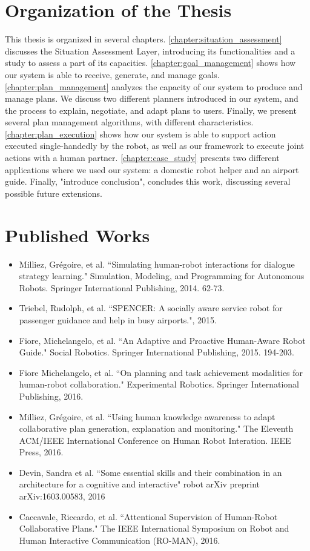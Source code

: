 \section{Organization of the Thesis}
This thesis is organized in several chapters. \ref{chapter:situation_assessment} discusses the Situation Assessment Layer, introducing its functionalities and a study to assess a part of its capacities. \ref{chapter:goal_management} shows how our system is able to receive, generate, and manage goals. \ref{chapter:plan_management} analyzes the capacity of our system to produce and manage plans. We discuss two different planners introduced in our system, and the process to explain, negotiate, and adapt plans to users. Finally, we present several plan management algorithms, with different characteristics. \ref{chapter:plan_execution} shows how our system is able to support action executed single-handedly by the robot, as well as our framework to execute joint actions with a human partner. \ref{chapter:case_study} presents two different applications where we used our system: a domestic robot helper and an airport guide. Finally, "introduce conclusion", concludes this work, discussing several possible future extensions. 

\section{Published Works}
\begin{itemize}
\item Milliez, Grégoire, et al. ``Simulating human-robot interactions for dialogue strategy learning." Simulation, Modeling, and Programming for Autonomous Robots. Springer International Publishing, 2014. 62-73.
\item Triebel, Rudolph, et al. ``SPENCER: A socially aware service robot for passenger guidance and help in busy airports.", 2015.
\item Fiore, Michelangelo, et al. ``An Adaptive and Proactive Human-Aware Robot Guide." Social Robotics. Springer International Publishing, 2015. 194-203.
\item Fiore Michelangelo, et al. ``On planning and task achievement modalities for human-robot collaboration." Experimental Robotics. Springer International Publishing, 2016.
\item Milliez, Grégoire, et al. ``Using human knowledge awareness to adapt collaborative plan generation, explanation and monitoring." The Eleventh ACM/IEEE International Conference on Human Robot Interation. IEEE Press, 2016.
\item Devin, Sandra et al. ``Some essential skills and their combination in an architecture for a cognitive and interactive" robot arXiv preprint arXiv:1603.00583, 2016
\item Caccavale, Riccardo, et al. ``Attentional Supervision of Human-Robot Collaborative Plans." The IEEE International Symposium on Robot and Human Interactive Communication (RO-MAN), 2016.
\end{itemize}